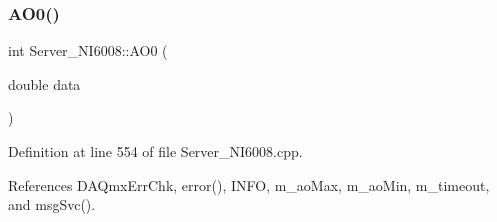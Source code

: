 \mbox{\label{classServer__NI6008_a53ef808ed00d7b7105b62c2ce34faaec}} 
\subsubsection{\texorpdfstring{A\+O0()}{AO0()}}
{\footnotesize\ttfamily int Server\+\_\+\+N\+I6008\+::\+A\+O0 (\begin{DoxyParamCaption}\item[{double}]{data }\end{DoxyParamCaption})}



Definition at line 554 of file Server\+\_\+\+N\+I6008.\+cpp.



References D\+A\+Qmx\+Err\+Chk, error(), I\+N\+FO, m\+\_\+ao\+Max, m\+\_\+ao\+Min, m\+\_\+timeout, and msg\+Svc().


